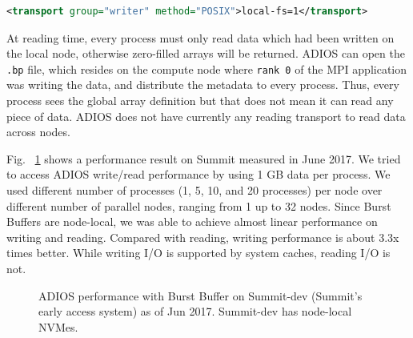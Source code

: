 \begin{lstlisting}[language=XML]
<transport group="writer" method="POSIX">local-fs=1</transport>
\end{lstlisting}

At reading time, every process must only read data which had been written on the local node, otherwise zero-filled arrays will be returned. ADIOS can open the \verb+.bp+ file, which resides on the compute node where \verb+rank 0+ of the MPI application was writing the data, and distribute the metadata to every process. Thus, every process sees the global array definition but that does not mean it can read any piece of data. ADIOS does not have currently any reading transport to read data across nodes. 

Fig. ~\ref{fig:summit} shows a performance result on Summit measured in June 2017. We tried to access ADIOS write/read performance by using 1 GB data per process. We used different number of processes (1, 5, 10, and 20 processes) per node over different number of parallel nodes, ranging from 1 up to 32 nodes. Since Burst Buffers are node-local, we was able to achieve almost linear performance on writing and reading. Compared with reading, writing performance is about 3.3x times better. While writing I/O is supported by system caches, reading I/O is not. 

\begin{figure}[h]
\center
{}
\caption{ADIOS performance with Burst Buffer on Summit-dev (Summit's early access system) as of Jun 2017. Summit-dev has node-local NVMes.}
\label{fig:summit}
\end{figure}

